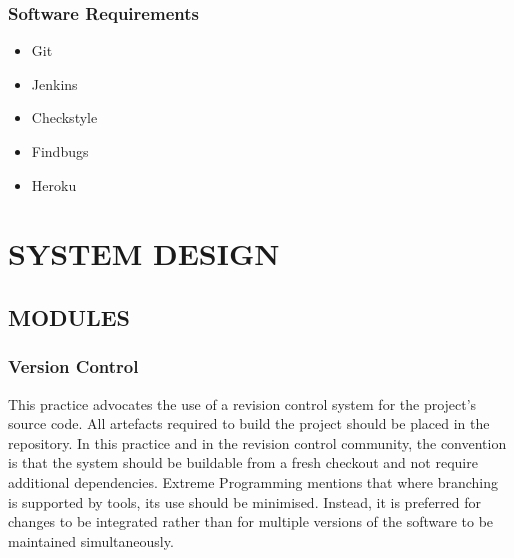 \documentclass[12pt,a4paper,oneside]{report}
\begin{document}
{\subsection{Software Requirements}
\begin{itemize}
\item Git
\item Jenkins
\item Checkstyle
\item Findbugs
\item Heroku
\end{itemize}
\chapter{SYSTEM DESIGN}
\section{MODULES}
\subsection{Version Control}

\par This practice advocates the use of a revision control system for the project's source code. All artefacts required to build the project should be placed in the repository. In this practice and in the revision control community, the convention is that the system should be buildable from a fresh checkout and not require additional dependencies.  Extreme Programming  mentions that where branching is supported by tools, its use should be minimised. Instead, it is preferred for changes to be integrated rather than for multiple versions of the software to be maintained simultaneously. 
}
\end{document}
